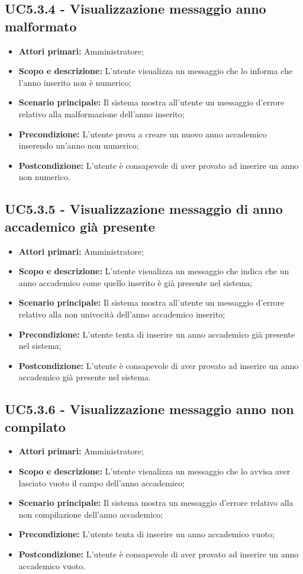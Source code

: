 \documentclass[AnalisiDeiRequisiti.tex]{subfiles}
\begin{document}
\subsection{UC5.3.4 - Visualizzazione messaggio anno malformato}
\begin{itemize}
	\item \textbf{Attori primari:} Amministratore;
	\item \textbf{Scopo e descrizione:} L'utente visualizza un messaggio che lo informa che l'anno inserito non è numerico;
	\item \textbf{Scenario principale:} Il sistema mostra all'utente un messaggio d'errore relativo alla malformazione dell'anno inserito;
	\item \textbf{Precondizione:} L'utente prova a creare un nuovo anno accademico inserendo un'anno non numerico; 
	\item \textbf{Postcondizione:} L'utente è consapevole di aver provato ad inserire un anno non numerico.
\end{itemize}
\subsection{UC5.3.5 - Visualizzazione messaggio di anno accademico già presente}
\begin{itemize}
	\item \textbf{Attori primari:} Amministratore;
	\item \textbf{Scopo e descrizione:} L'utente visualizza un messaggio che indica che un anno accademico come quello inserito è già presente nel sistema;
	\item \textbf{Scenario principale:} Il sistema mostra all'utente un messaggio d'errore relativo alla non univocità dell'anno accademico inserito;
	\item \textbf{Precondizione:} L'utente tenta di inserire un anno accademico già presente nel sistema; 
	\item \textbf{Postcondizione:} L'utente è consapevole di aver provato ad inserire un anno accademico già presente nel sistema.
\end{itemize}
\subsection{UC5.3.6 - Visualizzazione messaggio anno non compilato}
\begin{itemize}
	\item \textbf{Attori primari:} Amministratore;
	\item \textbf{Scopo e descrizione:} L'utente visualizza un messaggio che lo avvisa aver lasciato vuoto il campo dell'anno accademico;
	\item \textbf{Scenario principale:} Il sistema mostra un messaggio d'errore relativo alla non compilazione dell'anno accademico;
	\item \textbf{Precondizione:} L'utente tenta di inserire un anno accademico vuoto; 
	\item \textbf{Postcondizione:} L'utente è consapevole di aver provato ad inserire un anno accademico vuoto.
\end{itemize}
\end{document}
